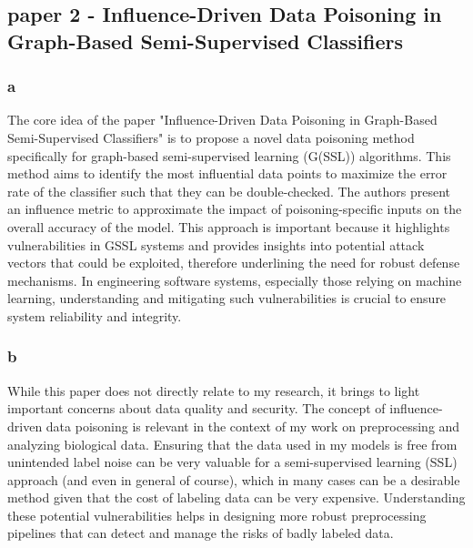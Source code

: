 \documentclass{article}
\begin{document}
\subsection{paper 2 - Influence-Driven Data Poisoning in Graph-Based
Semi-Supervised Classifiers}

\subsubsection{a}
The core idea of the paper "Influence-Driven Data Poisoning in Graph-Based Semi-Supervised Classifiers" is to propose a novel data poisoning method specifically for graph-based semi-supervised learning (G(SSL)) algorithms. This method aims to identify the most influential data points to maximize the error rate of the classifier such that they can be double-checked. The authors present an influence metric to approximate the impact of poisoning-specific inputs on the overall accuracy of the model. This approach is important because it highlights vulnerabilities in GSSL systems and provides insights into potential attack vectors that could be exploited, therefore underlining the need for robust defense mechanisms. In engineering software systems, especially those relying on machine learning, understanding and mitigating such vulnerabilities is crucial to ensure system reliability and integrity.

\subsubsection{b}
While this paper does not directly relate to my research, it brings to light important concerns about data quality and security. The concept of influence-driven data poisoning is relevant in the context of my work on preprocessing and analyzing biological data. Ensuring that the data used in my models is free from unintended label noise can be very valuable for a semi-supervised learning (SSL) approach (and even in general of course), which in many cases can be a desirable method given that the cost of labeling data can be very expensive. Understanding these potential vulnerabilities helps in designing more robust preprocessing pipelines that can detect and manage the risks of badly labeled data.
\end{document}
